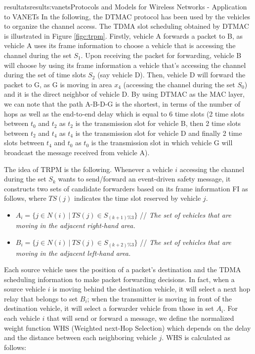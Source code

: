 \documentclass{ra2016}
\begin{document}
\begin{module}{resultats}{results:vanets}{Protocols and Models for Wireless Networks - Application to VANETs}
In the following, the DTMAC protocol has been used by the vehicles to organize the channel access. The TDMA slot 
scheduling obtained by DTMAC is illustrated in Figure \ref{figc:trpm}. Firstly, vehicle A forwards a packet to B, as  vehicle A uses its frame 
information to choose a vehicle that is accessing the channel during the set $S_1$. Upon receiving the packet for forwarding, vehicle B 
will choose by using its frame information a vehicle that's accessing the channel during the set of time slots $S_2$ 
(say vehicle D). Then, vehicle D will forward the packet to G, as G is moving in area $x_4$ (accessing the channel during the 
set $S_0$) and it is the direct neighbor of vehicle D. By using DTMAC as the MAC layer, we can note that the path A-B-D-G is 
the shortest, in terms of the number of hops as well as the end-to-end delay which  is equal to 6 time slots  (2 time slots 
between $t_0$ and $t_2$ as $t_2$ is the transmission slot for vehicle B, then 2 time slots between $t_2$ and $t_4$ as $t_4$ is the 
transmission slot for vehicle D and finally 2 time slots between $t_4$ and $t_0$ as $t_0$ is the transmission slot in which vehicle 
G will broadcast the message received from  vehicle A). 


The idea of TRPM is the following. Whenever a vehicle $i$ accessing the channel during the set $S_k$ wants to send/forward an 
event-driven safety message, it constructs two sets of candidate forwarders based on its frame information FI as 
follows, where $TS(j)$ indicates the time slot reserved by vehicle $j$.

\begin{itemize}
    \item $A_i=\{j\in N(i)~|~TS(j)\in S_{(k+1)\%3}\}$ // \textit{The set of vehicles that are moving in the adjacent right-hand area.}
    \item $B_i=\{j\in N(i)~|~TS(j)\in S_{(k+2)\%3}\}$ // \textit{The set of vehicles that are moving in the adjacent left-hand area.}
\end{itemize}

Each source vehicle uses the position of a packet's destination and the TDMA scheduling information to make packet forwarding 
decisions. In fact, when a source vehicle $i$ is moving behind the destination vehicle, it will select a next hop relay that 
belongs to set $B_i$; when the transmitter is moving in front of the destination vehicle, it will select a forwarder vehicle 
from those in  set $A_i$. %
For each vehicle $i$ that will send or forward a message, we define the normalized weight function WHS (Weighted next-Hop 
Selection) which depends on the delay and the distance between each neighboring vehicle $j$. WHS is calculated as follows:


\end{module}
\end{document}
